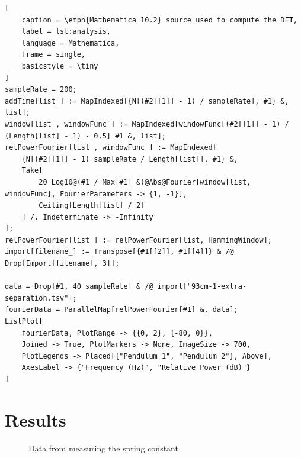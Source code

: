 \documentclass[a4paper]{scrartcl}
\begin{document}
\begin{lstlisting}[
    caption = \emph{Mathematica 10.2} source used to compute the DFT,
    label = lst:analysis,
    language = Mathematica,
    frame = single,
    basicstyle = \tiny
]
sampleRate = 200;
addTime[list_] := MapIndexed[{N[(#2[[1]] - 1) / sampleRate], #1} &, list];
window[list_, windowFunc_] := MapIndexed[windowFunc[(#2[[1]] - 1) / (Length[list] - 1) - 0.5] #1 &, list];
relPowerFourier[list_, windowFunc_] := MapIndexed[
    {N[(#2[[1]] - 1) sampleRate / Length[list]], #1} &,
    Take[
        20 Log10@(#1 / Max[#1] &)@Abs@Fourier[window[list, windowFunc], FourierParameters -> {1, -1}],
        Ceiling[Length[list] / 2]
    ] /. Indeterminate -> -Infinity
];
relPowerFourier[list_] := relPowerFourier[list, HammingWindow];
import[filename_] := Transpose[{#1[[2]], #1[[4]]} & /@ Drop[Import[filename], 3]];

data = Drop[#1, 40 sampleRate] & /@ import["93cm-1-extra-separation.tsv"];
fourierData = ParallelMap[relPowerFourier[#1] &, data];
ListPlot[
    fourierData, PlotRange -> {{0, 2}, {-80, 0}},
    Joined -> True, PlotMarkers -> None, ImageSize -> 700,
    PlotLegends -> Placed[{"Pendulum 1", "Pendulum 2"}, Above],
    AxesLabel -> {"Frequency (Hz)", "Relative Power (dB)"}
]
\end{lstlisting}

\section{Results}
\begin{figure}
    \centering
    \caption{Data from measuring the spring constant}
    \label{fig:spring}
\end{figure}
\end{document}
